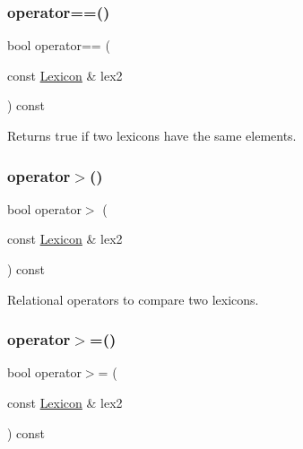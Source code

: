 \mbox{\label{classLexicon_a4fcab616682564bf55eb0b096a35219d}} 
\subsubsection{\texorpdfstring{operator==()}{operator==()}}
{\footnotesize\ttfamily bool operator== (\begin{DoxyParamCaption}\item[{const \mbox{\hyperlink{classLexicon}{Lexicon}} \&}]{lex2 }\end{DoxyParamCaption}) const}



Returns true if two lexicons have the same elements. 

\mbox{\label{classLexicon_a04139ff41f8d25adbf5958ff2b01b068}} 
\subsubsection{\texorpdfstring{operator$>$()}{operator>()}}
{\footnotesize\ttfamily bool operator$>$ (\begin{DoxyParamCaption}\item[{const \mbox{\hyperlink{classLexicon}{Lexicon}} \&}]{lex2 }\end{DoxyParamCaption}) const}



Relational operators to compare two lexicons. 

\mbox{\label{classLexicon_a05b7f6593b8b859858cf21ffbc9e5ab1}} 
\subsubsection{\texorpdfstring{operator$>$=()}{operator>=()}}
{\footnotesize\ttfamily bool operator$>$= (\begin{DoxyParamCaption}\item[{const \mbox{\hyperlink{classLexicon}{Lexicon}} \&}]{lex2 }\end{DoxyParamCaption}) const}




